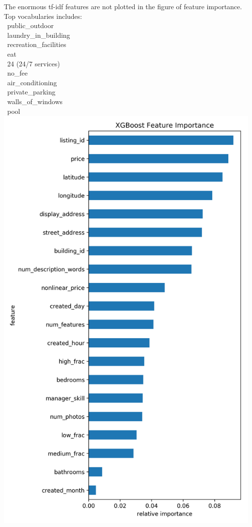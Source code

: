 \documentclass[landscape,final,a0paper,fontscale=0.285]{baposter}
\begin{document}
\begin{poster}
{  \begin{multicols}{2}
    {\footnotesize The enormous tf-idf features are not plotted in the figure of feature importance. Top vocabularies includes:\\
    \indent\textbullet ~public\_outdoor\\
    \indent\textbullet ~laundry\_in\_building\\
    \indent\textbullet ~recreation\_facilities\\
    \indent\textbullet ~eat\\
    \indent\textbullet ~24 (24/7 services)\\
    \indent\textbullet ~no\_fee\\
    \indent\textbullet ~air\_conditioning\\
    \indent\textbullet ~private\_parking\\
    \indent\textbullet ~walls\_of\_windows\\
    \indent\textbullet ~pool\\
    }
    {\centering\includegraphics[width=0.99\linewidth]{images/feature_importance_xgb_1.png}}
    

\end{multicols}}
\end{poster}
\end{document}
